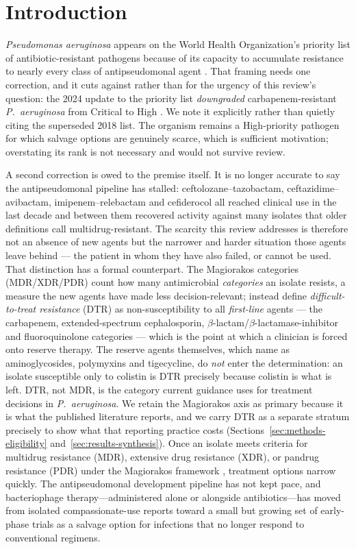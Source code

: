 \section{Introduction}
\label{sec:introduction}

\textit{Pseudomonas aeruginosa} appears on the World Health Organization's priority list of antibiotic-resistant pathogens because of its capacity to accumulate resistance to nearly every class of antipseudomonal agent \parencite{Tacconelli2018_who}. That framing needs one correction, and it cuts against rather than for the urgency of this review's question: the 2024 update to the priority list \emph{downgraded} carbapenem-resistant \textit{P.\ aeruginosa} from Critical to High \parencite{WHO2024_bppl}. We note it explicitly rather than quietly citing the superseded 2018 list. The organism remains a High-priority pathogen for which salvage options are genuinely scarce, which is sufficient motivation; overstating its rank is not necessary and would not survive review.

A second correction is owed to the premise itself. It is no longer accurate to say the antipseudomonal pipeline has stalled: ceftolozane--tazobactam, ceftazidime--avibactam, imipenem--relebactam and cefiderocol all reached clinical use in the last decade and between them recovered activity against many isolates that older definitions call multidrug-resistant. The scarcity this review addresses is therefore not an absence of new agents but the narrower and harder situation those agents leave behind --- the patient in whom they have also failed, or cannot be used. That distinction has a formal counterpart. The Magiorakos categories (MDR/XDR/PDR) count how many antimicrobial \emph{categories} an isolate resists, a measure the new agents have made less decision-relevant; \textcite{Kadri2018_dtr} instead define \emph{difficult-to-treat resistance} (DTR) as non-susceptibility to all \emph{first-line} agents --- the carbapenem, extended-spectrum cephalosporin, $\beta$-lactam/$\beta$-lactamase-inhibitor and fluoroquinolone categories --- which is the point at which a clinician is forced onto reserve therapy. The reserve agents themselves, which \citeauthor{Kadri2018_dtr} name as aminoglycosides, polymyxins and tigecycline, do \emph{not} enter the determination: an isolate susceptible only to colistin is DTR precisely because colistin is what is left. DTR, not MDR, is the category current guidance uses for treatment decisions in \textit{P.\ aeruginosa}. We retain the Magiorakos axis as primary because it is what the published literature reports, and we carry DTR as a separate stratum precisely to show what that reporting practice costs (Sections~\ref{sec:methods-eligibility} and~\ref{sec:results-synthesis}). Once an isolate meets criteria for multidrug resistance (MDR), extensive drug resistance (XDR), or pandrug resistance (PDR) under the Magiorakos framework \parencite{Magiorakos2012_mdrxdr}, treatment options narrow quickly. The antipseudomonal development pipeline has not kept pace, and bacteriophage therapy---administered alone or alongside antibiotics---has moved from isolated compassionate-use reports toward a small but growing set of early-phase trials as a salvage option for infections that no longer respond to conventional regimens.

